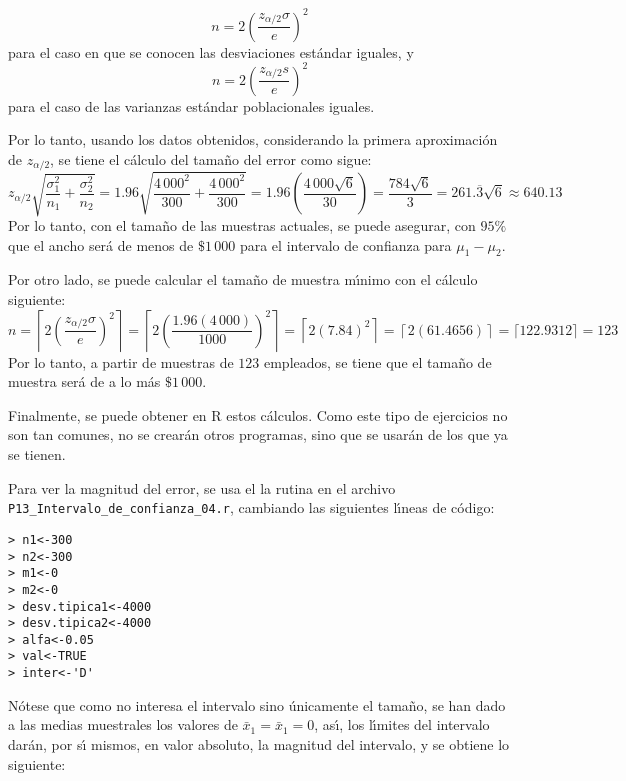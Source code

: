 \begin{solucion}
 \begin{equation*}
  n = 2\left( \frac{z_{\alpha/2} \sigma}{e}  \right)^2
 \end{equation*}
 para el caso en que se conocen las desviaciones est\'andar iguales, y
 \begin{equation*}
  n = 2\left( \frac{z_{\alpha/2} s}{e}  \right)^2
 \end{equation*}
 para el caso de las varianzas est\'andar poblacionales iguales.
 \par 
 Por lo tanto, usando los datos obtenidos, considerando la primera aproximaci\'on de $z_{\alpha/2}$, se tiene el c\'alculo del tama\~no del error como sigue:
 \begin{equation*}
  z_{\alpha/2}\sqrt{ \frac{\sigma_1^2}{n_1} + \frac{\sigma_2^2}{n_2}} = 1.96\sqrt{\frac{4\,000^2}{300} + \frac{4\,000^2}{300}} = 1.96\left( \frac{4\,000\sqrt{6}}{30} \right) = \frac{784\sqrt{6}}{3} = 261.\overline{3}\sqrt{6} \approx 640.13
 \end{equation*}
 Por lo tanto, con el tama\~no de las muestras actuales, se puede asegurar, con $95\%$ que el ancho ser\'a de menos de $\$1\,000$ para el intervalo de confianza para $\mu_1 - \mu_2$.
 \par 
 Por otro lado, se puede calcular el tama\~no de muestra m\'{\i}nimo con el c\'alculo siguiente:
 \begin{equation*}
  n = \left\lceil 2\left( \frac{z_{\alpha/2} \sigma}{e}  \right)^2 \right\rceil = \left\lceil 2\left( \frac{1.96 (4\,000)}{1000} \right)^2 \right\rceil = \left\lceil 2\left( 7.84 \right)^2 \right\rceil = \left\lceil 2(61.4656) \right\rceil = \lceil 122.9312 \rceil = 123
 \end{equation*}
 Por lo tanto, a partir de muestras de $123$ empleados, se tiene que el tama\~no de muestra ser\'a de a lo m\'as $\$1\,000$.
 \par 
 Finalmente, se puede obtener en R estos c\'alculos. Como este tipo de ejercicios no son tan comunes, no se crear\'an otros programas, sino que se usar\'an de los que ya se tienen.
 \par 
 Para ver la magnitud del error, se usa el la rutina en el archivo \texttt{P13\_Intervalo\_de\_confianza\_04.r}, cambiando las siguientes l\'{\i}neas de c\'odigo:
 \begin{verbatim}
> n1<-300
> n2<-300
> m1<-0
> m2<-0
> desv.tipica1<-4000
> desv.tipica2<-4000
> alfa<-0.05
> val<-TRUE
> inter<-'D'
 \end{verbatim}
 \vspace{-0.5cm}
 N\'otese que como no interesa el intervalo sino \'unicamente el tama\~no, se han dado a las medias muestrales los valores de $\bar{x}_1 = \bar{x}_1 = 0$, as\'{\i}, los l\'{\i}mites del intervalo dar\'an, por s\'{\i} mismos, en valor absoluto, la magnitud del intervalo, y se obtiene lo siguiente:

\end{solucion}
